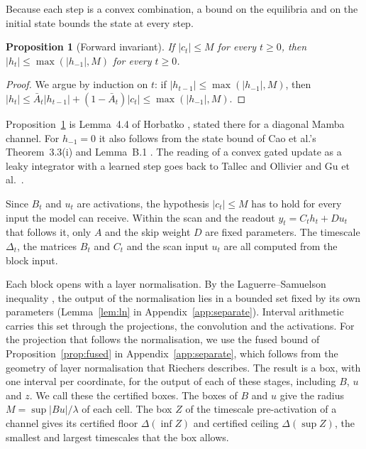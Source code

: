 \documentclass[11pt, a4paper]{article}
\newtheorem{proposition}{Proposition}
\theoremstyle{remark}
\theoremstyle{plain}
\newcommand{\Abar}{\bar{A}}
\begin{document}
Because each step is a convex combination, a bound on the equilibria and on the initial state
bounds the state at every step.

\begin{proposition}[Forward invariant]
\label{prop:invariant}
If $|c_t| \le M$ for every $t \ge 0$, then $|h_t| \le \max(|h_{-1}|, M)$ for every $t \ge 0$.
\end{proposition}

\begin{proof}
We argue by induction on $t$: if $|h_{t-1}| \le \max(|h_{-1}|, M)$, then
$|h_t| \le \Abar_t |h_{t-1}| + (1 - \Abar_t)|c_t| \le \max(|h_{-1}|, M)$.
\end{proof}

Proposition~\ref{prop:invariant} is Lemma~4.4 of Horbatko \citep{horbatko2026sessa}, stated there
for a diagonal Mamba channel. For $h_{-1} = 0$ it also follows from the state bound of Cao et al.'s
Theorem~3.3(i) and Lemma~B.1 \citep{cao2026control}. The reading of a convex gated update as a
leaky integrator with a learned step goes back to Tallec and Ollivier \citep{tallec2018warp} and
Gu et al.\ \citep{gu2021lssl}.

Since $B_t$ and $u_t$ are activations, the hypothesis $|c_t| \le M$ has to hold for every input the
model can receive. Within the scan and the readout $y_t = C_t h_t + D u_t$ that follows it, only
$A$ and the skip weight $D$ are fixed parameters. The timescale $\Delta_t$, the matrices $B_t$ and
$C_t$ and the scan input $u_t$ are all computed from the block input.

Each block opens with a layer normalisation. By the Laguerre--Samuelson inequality
\citep{laguerre1880methode,samuelson1968deviant}, the output of the normalisation lies in a bounded
set fixed by its own parameters (Lemma~\ref{lem:ln} in Appendix~\ref{app:separate})\@. Interval
arithmetic carries this set through the projections, the convolution and the activations. For the
projection that follows the normalisation, we use the fused bound of Proposition~\ref{prop:fused}
in Appendix~\ref{app:separate},
which follows from the geometry of layer normalisation that Riechers \citep{riechers2024layernorm}
describes. The result is a box, with one interval per coordinate, for the output of each of
these stages, including $B$, $u$ and $z$. We call these the certified boxes. The boxes of $B$ and
$u$ give the radius $M = \sup|Bu|/\lambda$ of each cell. The box $Z$ of the timescale
pre-activation of a channel gives its certified floor $\Delta(\inf Z)$ and certified ceiling
$\Delta(\sup Z)$, the smallest and largest timescales that the box allows.
\end{document}
